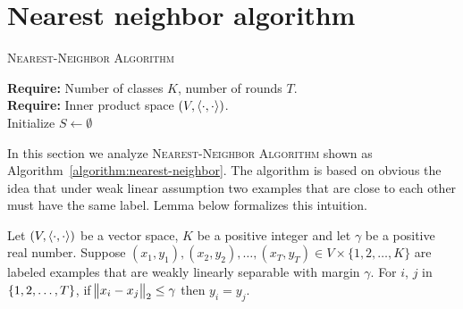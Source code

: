 \section{Nearest neighbor algorithm}
\label{section:nearest-neighbor-algorithm}

\begin{algorithm}[H]
\SetAlgoLined
\LinesNumbered
\caption{\textsc{Nearest-Neighbor Algorithm}
\label{algorithm:nearest-neighbor}
}
\textbf{Require:} Number of classes $K$, number of rounds $T$. \\
\textbf{Require:} Inner product space $(V,\left\langle \cdot, \cdot \right\rangle)$. \\
\nl Initialize $S \gets \emptyset$ \\
\nl {}
\end{algorithm}

In this section we analyze \textsc{Nearest-Neighbor Algorithm} shown as
Algorithm~\ref{algorithm:nearest-neighbor}. The algorithm is based on obvious
the idea that under weak linear assumption two examples that are close to each
other must have the same label. Lemma below formalizes this intuition.

\begin{lemma}
\label{lemma:non-separation-lemma}
Let $(V,\left\langle \cdot, \cdot \right\rangle)$ be a vector space, $K$ be a positive integer and let
$\gamma$ be a positive real number. Suppose $(x_1,y_1), (x_2,y_2), \dots, (x_T,
y_T) \in V \times \{1,2,\dots,K\}$ are labeled examples that are weakly linearly
separable with margin $\gamma$. For $i$, $j$ in $\cbr{1,2,\dots,T}$, if
$\norm{x_i - x_j}_2 \le \gamma$ then $y_i = y_j$.
\end{lemma}


